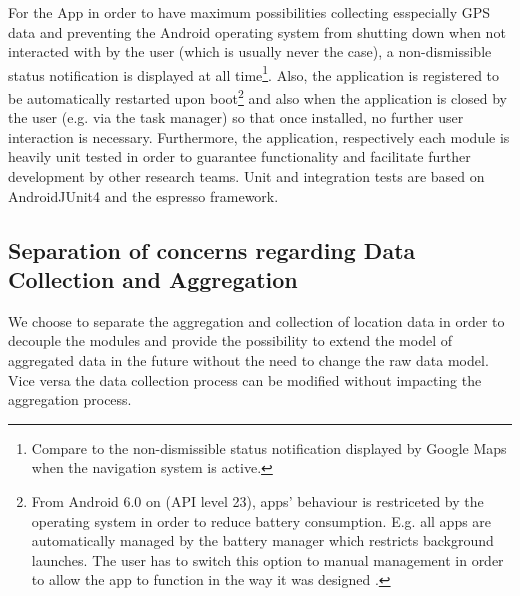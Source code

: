 For the App in order to have maximum possibilities collecting esspecially GPS data and preventing the Android operating system from shutting down when not interacted with by the user (which is usually never the case), a non-dismissible status notification is displayed at all time\footnote{Compare to the non-dismissible status notification displayed by Google Maps when the navigation system is active.}. Also, the application is registered to be automatically restarted upon boot\footnote{From Android 6.0 on (API level 23), apps' behaviour is restriceted by the operating system in order to reduce battery consumption. E.g. all apps are automatically managed by the battery manager which restricts background launches. The user has to switch this option to manual management in order to allow the app to function in the way it was designed \parencite{background, doze}.} and also when the application is closed by the user (e.g. via the task manager) so that once installed, no further user interaction is necessary.
Furthermore, the application, respectively each module is heavily unit tested in order to guarantee functionality and facilitate further development by other research teams. Unit and integration tests are based on AndroidJUnit4 \parencite{androidJunit4} and the espresso \parencite{espresso} framework.

\subsection{Separation of concerns regarding Data Collection and Aggregation}
We choose to separate the aggregation and collection of location data in order to decouple the modules and provide the possibility to extend the model of aggregated data in the future without the need to change the raw data model. Vice versa the data collection process can be modified without impacting the aggregation process.

